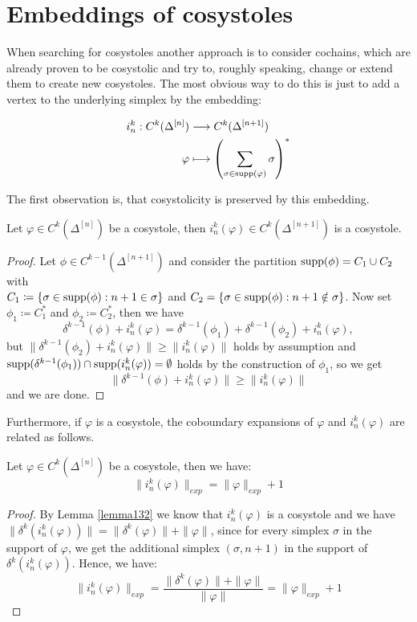 \section{Embeddings of cosystoles}

When searching for cosystoles another approach is to consider cochains, which are already proven to be cosystolic and try to, roughly speaking, change or extend them to create new cosystoles. The most obvious way to do this is just to add a vertex to the underlying simplex by the embedding:

\begin{align*}
i_n^k:C^k(\Delta^{[n]})&\longrightarrow C^k(\Delta^{[n+1]})\notag\\
\varphi&\longmapsto\left(\sum\limits_{\sigma\in\mathrm{supp}(\varphi)}\sigma\right)^*
\end{align*}

The first observation is, that cosystolicity is preserved by this embedding.

\begin{lem}\label{lemma132}
Let \(\varphi\in C^k(\Delta^{[n]})\) be a cosystole, then \(i_n^k(\varphi)\in C^k(\Delta^{[n+1]})\) is a cosystole.
\begin{proof}
Let \(\phi\in C^{k-1}(\Delta^{[n+1]})\) and consider the partition \(\mathrm{supp}(\phi)=C_1\cup C_2\) with\\
\(C_1\coloneqq \left\{\sigma\in\mathrm{supp}(\phi):n+1\in\sigma\right\}\) and \(C_2=\left\{\sigma\in\mathrm{supp}(\phi):n+1\notin\sigma\right\}\). Now set \(\phi_1\coloneqq C_1^*\) and \(\phi_2\coloneqq C_2^*\), then we have
\[
\delta^{k-1}(\phi)+i_n^k(\varphi)=\delta^{k-1}(\phi_1)+\delta^{k-1}(\phi_2)+i_n^k(\varphi),
\]
but \(\|\delta^{k-1}(\phi_2)+i_n^k(\varphi)\|\geq\|i_n^k(\varphi)\|\) holds by assumption and\\
\(\mathrm{supp}(\delta^{k-1}(\phi_1))\cap\mathrm{supp}(i_n^k(\varphi))=\emptyset\) holds by the construction of \(\phi_1\), so we get
\[
\|\delta^{k-1}(\phi)+i_n^k(\varphi)\|\geq\|i_n^k(\varphi)\|
\]
and we are done.
\end{proof}
\end{lem}

Furthermore, if \(\varphi\) is a cosystole, the coboundary expansions of \(\varphi\) and \(i_n^k(\varphi)\) are related as follows.

\begin{prop}\label{proposition113}
Let \(\varphi\in C^k(\Delta^{[n]})\) be a cosystole, then we have:
\[
\|i_n^k(\varphi)\|_{exp}=\|\varphi\|_{exp}+1
\]
\begin{proof}
By Lemma \ref{lemma132} we know that \(i_n^k(\varphi)\) is a cosystole and we have \(\|\delta^k(i_n^k(\varphi))\|=\|\delta^k(\varphi)\|+\|\varphi\|\), since for every simplex \(\sigma\) in the support of \(\varphi\), we get the additional simplex \((\sigma,n+1)\) in the support of \(\delta^k(i_n^k(\varphi))\). Hence, we have:
\[
\|i_n^k(\varphi)\|_{exp}=\frac{\|\delta^k(\varphi)\|+\|\varphi\|}{\|\varphi\|}=\|\varphi\|_{exp}+1
\]
\end{proof}
\end{prop}

